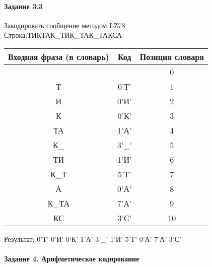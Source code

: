 \documentclass[a4paper, 12pt]{article}
\begin{document}
\paragraph{Задание 3.3}

Закодировать сообщение методом LZ78\\
Строка:ТИКТАК\_ТИК\_ТАК\_ТАКСА\\
\begin{table}[h!]
\centering
\begin{tabular}{|c|c|c|} 
\hline
 Входная фраза (в словарь) & Код & Позиция словаря \\ \hline

 &  & 0 \\ \hline
Т & 0'Т' & 1 \\ \hline
И & 0'И' & 2 \\ \hline
К & 0'К' & 3 \\ \hline
ТА & 1'А' & 4 \\ \hline
К\_ & 3'\_' & 5 \\ \hline
ТИ & 1'И' & 6 \\ \hline
К\_Т & 5'Т' & 7 \\ \hline
А & 0'А' & 8 \\ \hline
К\_ТА & 7'А' & 9 \\ \hline
КС & 3'С' & 10 \\ \hline
\end{tabular}
\end{table}

Результат: 0'Т' 0'И' 0'К' 1'А' 3'\_' 1'И' 5'Т' 0'А' 7'А' 3'С'\\
\pagebreak
\paragraph{Задание 4. Арифметическое кодирование\\}
\end{document}
